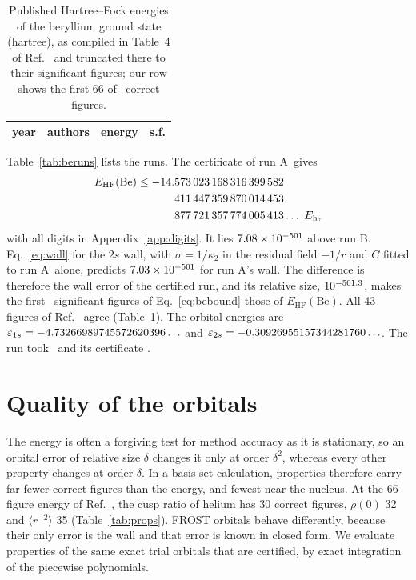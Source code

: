 \documentclass[aps,pra,reprint,superscriptaddress,amsmath,amssymb,longbibliography]{revtex4-2}
\newcommand{\eh}{E_\mathrm{h}}
\newcommand{\EHF}{E_\mathrm{HF}}
\begin{document}
\begin{table}[t]
\caption{Published Hartree--Fock energies of the beryllium ground state (hartree), as compiled in Table~4 of Ref.~\cite{Hatano2025} and truncated there to their significant figures; our row shows the first 66 of \BeNsf\ correct figures.}
\label{tab:behist}
\footnotesize
\begin{ruledtabular}
\begin{tabular}{rlll}
year & authors & energy & s.f. \\
\hline

\end{tabular}
\end{ruledtabular}
\end{table}

Table~\ref{tab:beruns} lists the runs. The certificate of run A\BeRef\ gives
\begin{equation}
\begin{split}
\EHF(\mathrm{Be})\le{}&\BeEsplit\ldots\ \eh ,
\end{split}\label{eq:bebound}
\end{equation}
with all digits in Appendix~\ref{app:digits}. It lies $7.08\times10^{-501}$ above run B\BeRef. Eq.~\eqref{eq:wall} for the $2s$ wall, with $\sigma=1/\kappa_2$ in the residual field $-1/r$ and $C$ fitted to run A\BeWallFrom\ alone, predicts $7.03\times10^{-501}$ for run A\BeRef's wall. The difference is therefore the wall error of the certified run, and its relative size, $10^{-501.3}$, makes the first \BeNsf\ significant figures of Eq.~\eqref{eq:bebound} those of $\EHF(\mathrm{Be})$. All 43 figures of Ref.~\cite{Hatano2025} agree (Table~\ref{tab:behist}). The orbital energies are $\varepsilon_{1s}=-4.73266989745572620396\ldots$ and $\varepsilon_{2s}=-0.30926955157344281760\ldots$. The run took \BeTime\ and its certificate \BeCertTime.

\section{Quality of the orbitals}\label{sec:orbitals}

The energy is often a forgiving test for method accuracy as it is stationary, so an orbital error of relative size $\delta$ changes it only at order $\delta^2$, whereas every other property changes at order $\delta$. In a basis-set calculation, properties therefore carry far fewer correct figures than the energy, and fewest near the nucleus. At the 66-figure energy of Ref.~\cite{Hatano2025}, the cusp ratio of helium has 30 correct figures, $\rho(0)$ 32 and $\langle r^{-2}\rangle$ 35 (Table~\ref{tab:props}). FROST orbitals behave differently, because their only error is the wall and that error is known in closed form. We evaluate properties of the same exact trial orbitals that are certified, by exact integration of the piecewise polynomials.
\end{document}
